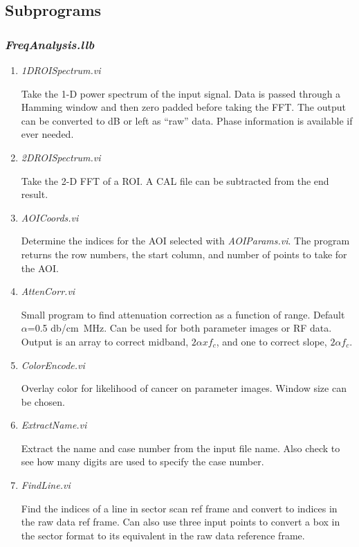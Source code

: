 \documentclass[10pt]{article}
\begin{document}
\subsection{Subprograms}

\subsubsection{{\it FreqAnalysis.llb}}


\begin{enumerate}
\item {\it 1DROISpectrum.vi}

Take the 1-D power spectrum of the input signal. Data is passed
through a Hamming window and then zero padded before taking the
FFT. The output can be converted to dB or left as ``raw'' data.
Phase information is available if ever needed.

\item {\it 2DROISpectrum.vi}

Take the 2-D FFT of a ROI. A CAL file can be subtracted from the
end result.

\item {\it AOICoords.vi}

Determine the indices for the AOI selected with {\it
AOIParams.vi}. The program returns the row numbers, the start
column, and number of points to take for the AOI.


\item {\it AttenCorr.vi}

Small program to find attenuation correction as a function of
range. Default $\alpha$=0.5 db/cm~MHz. Can be used for both
parameter images or RF data. Output is an array to correct
midband, $2 \alpha x f_{c}$, and one to correct slope, $2\alpha
f_{c}$.

\item{{\it ColorEncode.vi}}

Overlay color for likelihood of cancer on parameter images. Window
size can be chosen.

\item {\it ExtractName.vi}

Extract the name and case number from the input file name. Also
check to see how many digits are used to specify the case number.

\item {\it FindLine.vi}

Find the indices of a line in sector scan ref frame and convert to
indices in the raw data ref frame. Can also use three input points
to convert a box in the sector format to its equivalent in the raw
data reference frame.


\end{enumerate}
\end{document}
